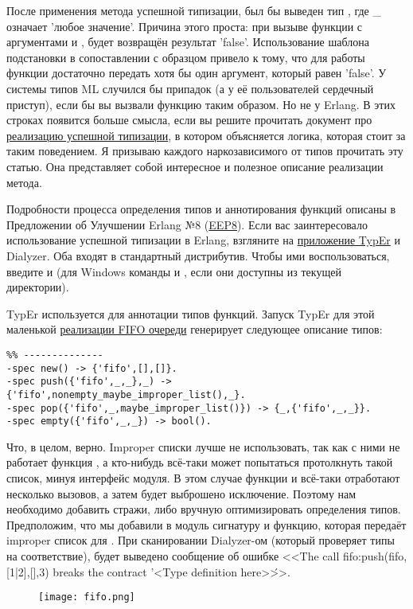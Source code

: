 После применения метода успешной типизации, был бы выведен тип , где \_ означает 'любое значение'.
Причина этого проста: при вызыве функции с аргументами  и , будет возвращён результат 'false'.
Использование шаблона подстановки \ops{\strut\_} в сопоставлении с образцом привело к тому, что для работы функции достаточно передать хотя бы один аргумент, который равен 'false'.
У системы типов ML случился бы припадок (а у её пользователей сердечный приступ), если бы вы вызвали функцию таким образом.
Но не у Erlang.
В этих строках появится больше смысла, если вы решите прочитать документ про \href{http://www.it.uu.se/research/group/hipe/papers/succ\_types.pdf}{реализацию успешной типизации}, в котором объясняется логика, которая стоит за таким поведением.
Я призываю каждого наркозависимого от типов прочитать эту статью.
Она представляет собой интересное и полезное описание реализации метода.

Подробности процесса определения типов и аннотирования функций описаны в Предложении об Улучшении Erlang №8 (\href{http://www.erlang.org/eeps/eep-0008.html}{EEP8}).
Если вас заинтересовало использование успешной типизации в Erlang, взгляните на \href{http://user.it.uu.se/~tobiasl/publications/typer.pdf}{приложение TypEr} и Dialyzer.
Оба входят в стандартный дистрибутив.
Чтобы ими воспользоваться, введите  и  (для Windows команды  и , если они доступны из текущей директории).

TypEr используется для аннотации типов функций.
Запуск TypEr для этой маленькой \href{http://learnyousomeerlang.com/static/erlang/fifo.erl}{реализации FIFO очереди} генерирует следующее описание типов:
\begin{lstlisting}[style=erlang]
%% File: fifo.erl
%% --------------
-spec new() -> {'fifo',[],[]}.
-spec push({'fifo',_,_},_) -> {'fifo',nonempty_maybe_improper_list(),_}.
-spec pop({'fifo',_,maybe_improper_list()}) -> {_,{'fifo',_,_}}.
-spec empty({'fifo',_,_}) -> bool().
\end{lstlisting}

Что, в целом, верно.
Improper списки лучше не использовать, так как с ними не работает функция , а кто\--нибудь всё\--таки может попытаться протолкнуть такой список, минуя интерфейс модуля.
В этом случае функции  и  всё\--таки отработают несколько вызовов, а затем будет выброшено исключение.
Поэтому нам необходимо добавить стражи, либо вручную оптимизировать определения типов.
Предположим, что мы добавили в модуль сигнатуру  и функцию, которая передаёт improper список для .
При сканировании Dialyzer\--ом (который проверяет типы на соответствие), будет выведено сообщение об ошибке <<The call fifo:push({fifo,[1|2],[]},3) breaks the contract '<Type definition here>\'>>.
\begin{figure}[h!]
    \centering
    \texttt{[image: fifo.png]}
\end{figure} 

